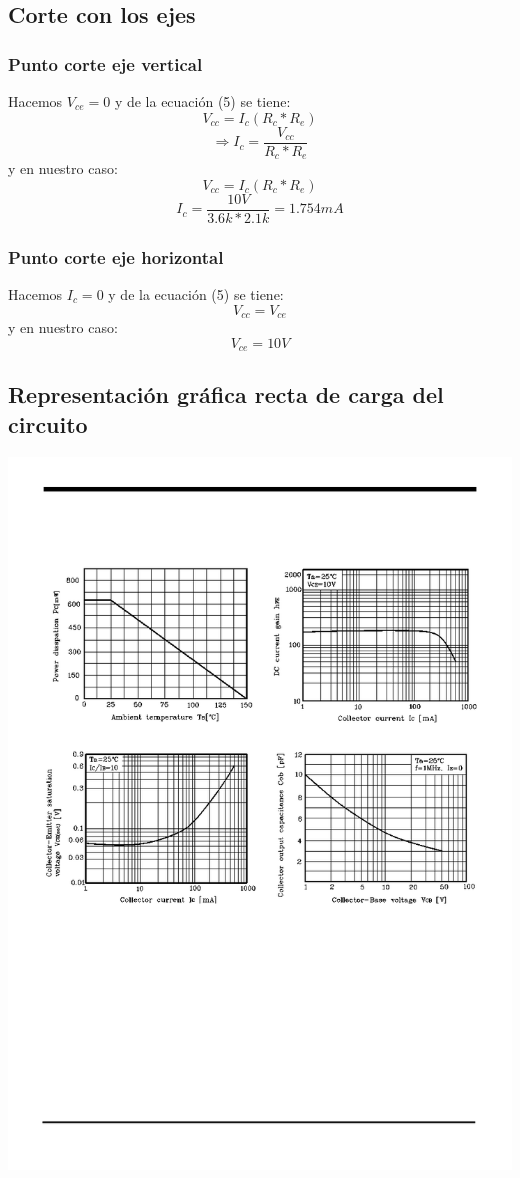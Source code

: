 \documentclass[10pt,a4paper]{article}
\begin{document}
\subsection{Corte con los ejes}
\subsubsection{Punto corte eje vertical}
Hacemos $V_{ce}=0$ y de  la ecuación (5) se tiene:
\[V_{cc}=I_{c}(R_{c}*R_{e})\]
\[\Rightarrow I_{c}=\frac{V_{cc}}{R_{c}*R_{e}}\]
y en nuestro caso:
\[V_{cc}=I_{c}(R_{c}*R_{e})\]
\[I_{c}=\frac{10V}{3.6k*2.1k} = 1.754 mA \]
\subsubsection{Punto corte eje horizontal}
Hacemos $I_{c}=0$ y de  la ecuación (5) se tiene:
\[V_{cc}=V_{ce}\]
y en nuestro caso:
\[V_{ce}=10V\]
\subsection{Representación gráfica recta de carga del circuito}

\includegraphics[scale=1]{Images/PN2222.png}
\end{document}
